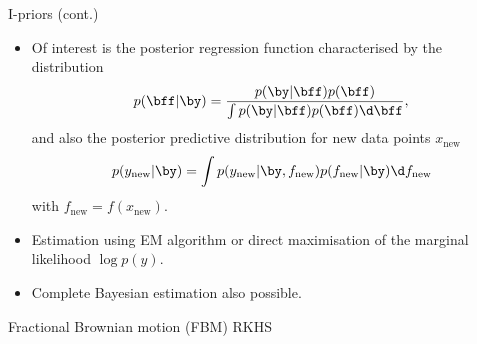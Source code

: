 \begin{frame}{I-priors (cont.)}
  \vspace{-5pt}
  \begin{itemize}\setlength\itemsep{0.8em}
    \item Of interest is the posterior regression function characterised by the distribution
    \[
      p(\bff | \by ) = \frac{p(\by | \bff) p(\bff)}{\int p(\by | \bff) p(\bff) \d\bff},
    \]
    and also the posterior predictive distribution for new data points $x_{\text{new}}$
    \[
      p(y_{\text{new}} | \by) = \int p(y_{\text{new}} | \by, f_{\text{new}}) p(f_{\text{new}} | \by ) \d f_{\text{new}}
    \]
    with $f_{\text{new}} = f(x_{\text{new}})$.
    \item Estimation using EM algorithm or direct maximisation of the marginal likelihood $\log p(y)$.
    \item Complete Bayesian estimation also possible.
  \end{itemize}
  \vspace{5pt}
\end{frame}


\begin{frame}{Fractional Brownian motion (FBM) RKHS}
  \vspace{-5pt}
\end{frame}

